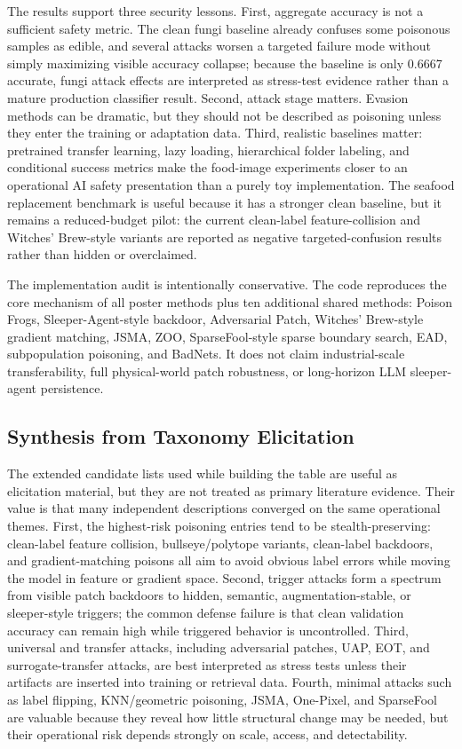 ﻿\documentclass[6p,10pt,times]{ieeeaccess}
\begin{document}
The results support three security lessons. First, aggregate accuracy is not a sufficient safety metric. The clean fungi baseline already confuses some poisonous samples as edible, and several attacks worsen a targeted failure mode without simply maximizing visible accuracy collapse; because the baseline is only 0.6667 accurate, fungi attack effects are interpreted as stress-test evidence rather than a mature production classifier result. Second, attack stage matters. Evasion methods can be dramatic, but they should not be described as poisoning unless they enter the training or adaptation data. Third, realistic baselines matter: pretrained transfer learning, lazy loading, hierarchical folder labeling, and conditional success metrics make the food-image experiments closer to an operational AI safety presentation than a purely toy implementation. The seafood replacement benchmark is useful because it has a stronger clean baseline, but it remains a reduced-budget pilot: the current clean-label feature-collision and Witches' Brew-style variants are reported as negative targeted-confusion results rather than hidden or overclaimed.

The implementation audit is intentionally conservative. The code reproduces the core mechanism of all poster methods plus ten additional shared methods: Poison Frogs, Sleeper-Agent-style backdoor, Adversarial Patch, Witches' Brew-style gradient matching, JSMA, ZOO, SparseFool-style sparse boundary search, EAD, subpopulation poisoning, and BadNets. It does not claim industrial-scale transferability, full physical-world patch robustness, or long-horizon LLM sleeper-agent persistence.

\subsection{Synthesis from Taxonomy Elicitation}

The extended candidate lists used while building the table are useful as elicitation material, but they are not treated as primary literature evidence. Their value is that many independent descriptions converged on the same operational themes. First, the highest-risk poisoning entries tend to be stealth-preserving: clean-label feature collision, bullseye/polytope variants, clean-label backdoors, and gradient-matching poisons all aim to avoid obvious label errors while moving the model in feature or gradient space. Second, trigger attacks form a spectrum from visible patch backdoors to hidden, semantic, augmentation-stable, or sleeper-style triggers; the common defense failure is that clean validation accuracy can remain high while triggered behavior is uncontrolled. Third, universal and transfer attacks, including adversarial patches, UAP, EOT, and surrogate-transfer attacks, are best interpreted as stress tests unless their artifacts are inserted into training or retrieval data. Fourth, minimal attacks such as label flipping, KNN/geometric poisoning, JSMA, One-Pixel, and SparseFool are valuable because they reveal how little structural change may be needed, but their operational risk depends strongly on scale, access, and detectability.
\end{document}
